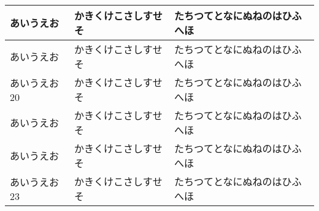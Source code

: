\documentclass{jsce}
\begin{document}
\begin{table}
\begin{center}
\begin{tabular}{|p{6cm}|p{8cm}|p{8cm}|}
あいうえお & かきくけこさしすせそ & たちつてとなにぬねのはひふへほ \\ \hline
あいうえお & かきくけこさしすせそ & たちつてとなにぬねのはひふへほ \\ \hline
あいうえお20 & かきくけこさしすせそ & たちつてとなにぬねのはひふへほ \\ \hline
あいうえお & かきくけこさしすせそ & たちつてとなにぬねのはひふへほ \\ \hline
あいうえお & かきくけこさしすせそ & たちつてとなにぬねのはひふへほ \\ \hline
あいうえお23 & かきくけこさしすせそ & たちつてとなにぬねのはひふへほ \\ \hline
\end{tabular}
\end{center}
\end{table}
%
\noindent
\mbox{} %
%
\clearpage
\thispagestyle{empty} %
\mbox{}\vfill
%
\noindent
\mbox{} %
\hfill
\end{document}
